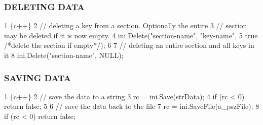 \subsubsection*{D\+E\+L\+E\+T\+I\+N\+G D\+A\+T\+A}


\begin{DoxyCode}
1 \{c++\}
2 // deleting a key from a section. Optionally the entire
3 // section may be deleted if it is now empty.
4 ini.Delete("section-name", "key-name", 
5     true /*delete the section if empty*/);
6 
7 // deleting an entire section and all keys in it
8 ini.Delete("section-name", NULL);
\end{DoxyCode}


\subsubsection*{S\+A\+V\+I\+N\+G D\+A\+T\+A}


\begin{DoxyCode}
1 \{c++\}
2 // save the data to a string
3 rc = ini.Save(strData);
4 if (rc < 0) return false;
5 
6 // save the data back to the file
7 rc = ini.SaveFile(a\_pszFile);
8 if (rc < 0) return false;
\end{DoxyCode}
 